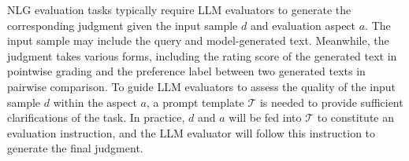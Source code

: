 NLG evaluation tasks typically require LLM evaluators to generate the corresponding judgment given the input sample $d$ and evaluation aspect $a$. 
The input sample may include the query and model-generated text. 
Meanwhile, the judgment takes various forms, including the rating score of the generated text in pointwise grading and the preference label between two generated texts in pairwise comparison.
To guide LLM evaluators to assess the quality of the input sample $d$ within the aspect $a$, a prompt template $\mathcal{T}$ is needed to provide sufficient clarifications of the task.
In practice, $d$ and $a$ will be fed into $\mathcal{T}$ to constitute an evaluation instruction, and the LLM evaluator will follow this instruction to generate the final judgment.


